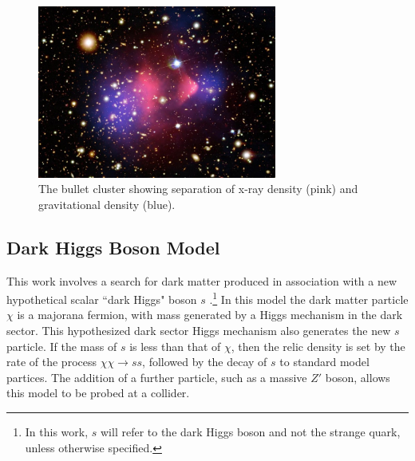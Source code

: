\begin{figure}[H]
    \centering
    \includegraphics[width=0.7\textwidth]{Figures/1/bullet.png}
    \caption{The bullet cluster showing separation of x-ray density (pink) and gravitational density (blue).}
    \label{fig:bullet}
\end{figure}

\subsection{Dark Higgs Boson Model}
\label{subsection:dh_model}
This work involves a search for dark matter produced in association with a new hypothetical scalar ``dark Higgs" boson $s$ \cite{Hunting}.\footnote{In this work, $s$ will refer  to the dark Higgs boson and not the strange quark, unless otherwise specified.} In this model the dark matter particle $\chi$ is a majorana fermion, with mass generated by a Higgs mechanism in the dark sector. This hypothesized dark sector Higgs mechanism also generates the new $s$ particle. If the mass of $s$ is less than that of $\chi$, then the relic density is set by the rate of the process $\chi\chi \rightarrow ss$, followed by the decay of $s$ to standard model partices. The addition of a further particle, such as a massive $Z'$ boson, allows this model to be probed at a collider.


